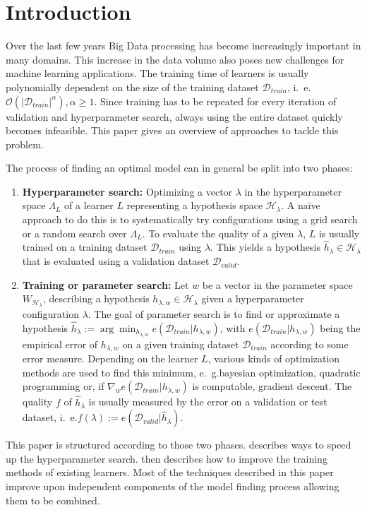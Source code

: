 \chapter{Introduction}%
\label{sec:intro}

\setcounter{page}{1}			%

Over the last few years Big Data processing has become increasingly important in many domains.
This increase in the data volume also poses new challenges for machine learning applications.
The training time of learners is usually polynomially dependent on the size of the training dataset \(\mathcal{D}_{\mathit{train}}\), i.~e. \(\mathcal{O}(|\mathcal{D}_{\mathit{train}}|^\alpha), \alpha \geq 1\).
Since training has to be repeated for every iteration of validation and hyperparameter search, always using the entire dataset quickly becomes infeasible.
This paper gives an overview of approaches to tackle this problem.

The process of finding an optimal model can in general be split into two phases:
\begin{enumerate}
	\item \textbf{Hyperparameter search:}
		Optimizing a vector \(\lambda\) in the hyperparameter space \(\Lambda_L\) of a learner \(L\) representing a hypothesis space \(\mathcal{H}_{\lambda}\).
		A na\"ive approach to do this is to systematically try configurations using a grid search or a random search over \(\Lambda_L\).
		To evaluate the quality of a given \(\lambda\), \(L\) is usually trained on a training dataset \(\mathcal{D}_{\mathit{train}}\) using \(\lambda\). This yields a hypothesis \(\hat{h}_\lambda \in \mathcal{H}_{\lambda}\) that is evaluated using a validation dataset \(\mathcal{D}_{\mathit{valid}}\).
	\item \textbf{Training or parameter search:}
		Let \(w\) be a vector in the parameter space \(W_{\mathcal{H}_\lambda}\), describing a hypothesis \(h_{\lambda, w} \in \mathcal{H}_\lambda\) given a hyperparameter configuration \(\lambda\).
		The goal of parameter search is to find or approximate a hypothesis \(\hat{h}_\lambda := \arg\min_{h_{\lambda, w}}{e(\mathcal{D}_{\mathit{train}} | h_{\lambda, w})}\), with \(e(\mathcal{D}_{\mathit{train}} | h_{\lambda, w})\) being the empirical error of \(h_{\lambda, w}\) on a given training dataset \(\mathcal{D}_{\mathit{train}}\) according to some error measure.
		Depending on the learner \(L\), various kinds of optimization methods are used to find this minimum, e.~g.\@ bayesian optimization, quadratic programming or, if \(\nabla_w e(\mathcal{D}_{\mathit{train}} | h_{\lambda, w})\) is computable, gradient descent.
		The quality \(f\) of \(\hat{h}_\lambda\) is usually measured by the error on a validation or test dataset, i.~e.\@ \(f(\lambda) := e(\mathcal{D}_{\mathit{valid}} | \hat{h}_\lambda)\).
\end{enumerate}
This paper is structured according to those two phases.
 describes ways to speed up the hyperparameter search.
 then describes how to improve the training methods of existing learners.
Most of the techniques described in this paper improve upon independent components of the model finding process allowing them to be combined.

